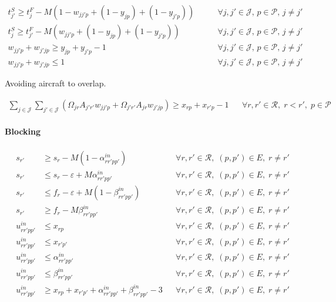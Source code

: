 \begin{align}
t^{S}_{j'} \ge t^{F}_j 
- M \left( 1 - w_{jj'p} + (1-y_{jp}) + (1-y_{j'p}) \right)
& \qquad \forall j, j' \in \mathcal{J}, \, p \in \mathcal{P}, \, j \neq j'
\\
t^{S}_{j} \ge t^{F}_{j'} 
- M \left( w_{jj'p} + (1-y_{jp}) + (1-y_{j'p}) \right)
& \qquad \forall j, j' \in \mathcal{J}, \, p \in \mathcal{P}, \, j \neq j' \\
w_{jj'p} + w_{j'jp} \ge y_{jp} + y_{j'p} - 1
& \qquad \forall j, j' \in \mathcal{J}, \, p \in \mathcal{P}, \, j \neq j' \\
w_{jj'p} + w_{j'jp} \le 1
& \qquad \forall j, j' \in \mathcal{J}, \, p \in \mathcal{P}, \, j \neq j'
\end{align}

Avoiding aircraft to overlap.

\begin{align}
\sum_{j \in \mathcal{J}} \sum_{j' \in \mathcal{J}} \left( \Omega_{jr} A_{j'r'} w_{jj'p} + \Omega_{j'r'} A_{jr} w_{j'jp} \right) \ge x_{rp} + x_{r'p} - 1
&& \forall r,r' \in \mathcal{R},\; r < r',\; p \in \mathcal{P}
\label{eq:non-overlap-aircraft}
\end{align}

\paragraph{Blocking}

\begin{align}
s_{r'} &\ge s_r - M \left( 1 - \alpha^{in}_{rr'pp'} \right)
&& \forall r,r' \in \mathcal{R},\; (p,p') \in E,\; r \neq r' \\
s_{r'} &\le s_r - \varepsilon + M \alpha^{in}_{rr'pp'}
&& \forall r,r' \in \mathcal{R},\; (p,p') \in E,\; r \neq r' \\
s_{r'} &\le f_r - \varepsilon + M \left( 1 - \beta^{in}_{rr'pp'} \right)
&& \forall r,r' \in \mathcal{R},\; (p,p') \in E,\; r \neq r' \\
s_{r'} &\ge f_r - M \beta^{in}_{rr'pp'}
&& \forall r,r' \in \mathcal{R},\; (p,p') \in E,\; r \neq r' \\
u^{in}_{rr'pp'} &\le x_{rp}
&& \forall r,r' \in \mathcal{R},\; (p,p') \in E,\; r \neq r' \\
u^{in}_{rr'pp'} &\le x_{r'p'}
&& \forall r,r' \in \mathcal{R},\; (p,p') \in E,\; r \neq r' \\
u^{in}_{rr'pp'} &\le \alpha^{in}_{rr'pp'}
&& \forall r,r' \in \mathcal{R},\; (p,p') \in E,\; r \neq r' \\
u^{in}_{rr'pp'} &\le \beta^{in}_{rr'pp'}
&& \forall r,r' \in \mathcal{R},\; (p,p') \in E,\; r \neq r' \\
u^{in}_{rr'pp'} &\ge x_{rp} + x_{r'p'} + \alpha^{in}_{rr'pp'} + \beta^{in}_{rr'pp'} - 3
&& \forall r,r' \in \mathcal{R},\; (p,p') \in E,\; r \neq r'
\end{align}


